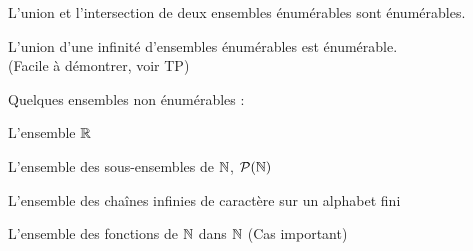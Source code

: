 \begin{myprop}
L'union et l'intersection de deux ensembles énumérables sont énumérables.
\end{myprop}

\begin{myprop}
L'union d'une infinité d'ensembles énumérables est énumérable.\\ (Facile à
		démontrer, voir TP)
\end{myprop}

Quelques ensembles non énumérables : 
\begin{myexem}
 L'ensemble $\mathbb{R}$
\end{myexem}

\begin{myexem}
 L'ensemble des sous-ensembles de $\mathbb{N}$, $\mathcal{P}(\mathbb{N})$
\end{myexem}

\begin{myexem}
 L'ensemble des chaînes infinies de caractère sur un alphabet fini
\end{myexem}

\begin{myexem}
 L'ensemble des fonctions de $\mathbb{N}$ dans $\mathbb{N}$ (Cas important)
\end{myexem}


